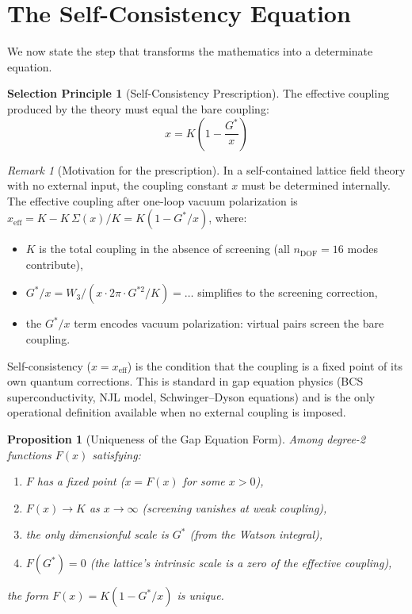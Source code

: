 \documentclass[12pt]{article}
\newtheorem{proposition}[theorem]{Proposition}
\theoremstyle{definition}
\newtheorem{selection}[theorem]{Selection Principle}
\theoremstyle{remark}
\newtheorem{remark}[theorem]{Remark}
\begin{document}
\section{The Self-Consistency Equation}
\label{sec:gap}

We now state the step that transforms the mathematics into a determinate equation.

\begin{selection}[Self-Consistency Prescription]
\label{sel:gap}
The effective coupling produced by the theory must equal the bare coupling:
\begin{equation}
    x = K\left(1 - \frac{G^*}{x}\right)
    \label{eq:gap-prescription}
\end{equation}
\end{selection}

\begin{remark}[Motivation for the prescription]
In a self-contained lattice field theory with no external input, the coupling constant $x$ must be determined internally. The effective coupling after one-loop vacuum polarization is $x_{\mathrm{eff}} = K - K\,\Sigma(x)/K = K(1 - G^*/x)$, where:
\begin{itemize}[nosep]
    \item $K$ is the total coupling in the absence of screening (all $n_{\mathrm{DOF}} = 16$ modes contribute),
    \item $G^*/x = W_3/(x\cdot 2\pi\cdot G^{*2}/K) = \ldots$ simplifies to the screening correction,
    \item the $G^*/x$ term encodes vacuum polarization: virtual pairs screen the bare coupling.
\end{itemize}
Self-consistency ($x = x_{\mathrm{eff}}$) is the condition that the coupling is a fixed point of its own quantum corrections. This is standard in gap equation physics (BCS superconductivity, NJL model, Schwinger--Dyson equations) and is the only operational definition available when no external coupling is imposed.
\end{remark}

\begin{proposition}[Uniqueness of the Gap Equation Form]
\label{prop:gap-unique}
Among degree-2 functions $F(x)$ satisfying:
\begin{enumerate}[nosep]
    \item $F$ has a fixed point ($x = F(x)$ for some $x > 0$),
    \item $F(x) \to K$ as $x \to \infty$ (screening vanishes at weak coupling),
    \item the only dimensionful scale is $G^*$ (from the Watson integral),
    \item $F(G^*) = 0$ (the lattice's intrinsic scale is a zero of the effective coupling),
\end{enumerate}
the form $F(x) = K(1 - G^*/x)$ is unique.
\end{proposition}
\end{document}

